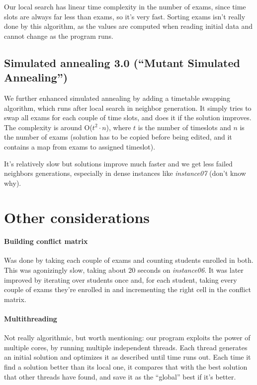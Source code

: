 \documentclass[11pt, a4paper, leqno]{article}
\begin{document}
	Our local search has linear time complexity in the number of exams, since time slots are always far less than exams, so it's very fast. Sorting exams isn't really done by this algorithm, as the values are computed when reading initial data and cannot change as the program runs.
	
	\subsection{Simulated annealing 3.0 (``Mutant Simulated Annealing\texttrademark'')}
	
	We further enhanced simulated annealing by adding a timetable swapping algorithm, which runs after local search in neighbor generation. It simply tries to swap all exams for each couple of time slots, and does it if the solution improves. The complexity is around O($t^2\cdot n$), where $t$ is the number of timeslots and $n$ is the number of exams (solution has to be copied before being edited, and it contains a map from exams to assigned timeslot).
	
	It's relatively slow but solutions improve much faster and we get less failed neighbors generations, especially in dense instances like \textit{instance07} (don't know why).
	
	\section{Other considerations}
	
	\paragraph{Building conflict matrix}
	
	Was done by taking each couple of exams and counting students enrolled in both. This was agonizingly slow, taking about 20 seconds on \textit{instance06}. It was later improved by iterating over students once and, for each student, taking every couple of exams they're enrolled in and incrementing the right cell in the conflict matrix.
	
	\paragraph{Multithreading}
	
	Not really algorithmic, but worth mentioning: our program exploits the power of multiple cores, by running multiple independent threads. Each thread generates an initial solution and optimizes it as described until time runs out. Each time it find a solution better than its local one, it compares that with the best solution that other threads have found, and save it as the ``global'' best if it's better.
	
\end{document}
